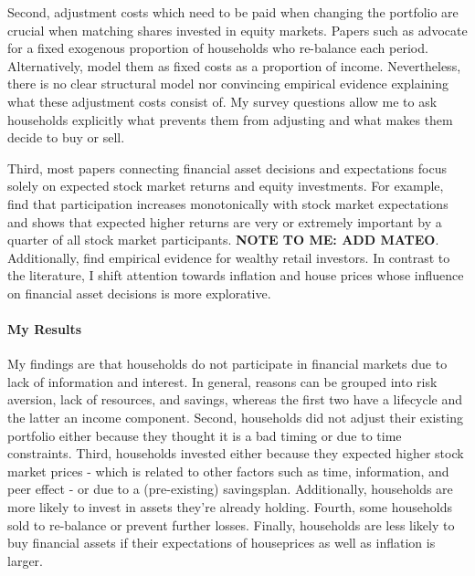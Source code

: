 \documentclass[ProjectABM]{subfiles}
\begin{document}
Second, adjustment costs which need to be paid when changing the portfolio are crucial when matching shares invested in equity markets. Papers such as \cite{giglio_et_al_2019five} advocate for a fixed exogenous proportion of households who re-balance each period. Alternatively,  \cite{bonaparte_et_al_2012adjustment} model them as fixed costs as a proportion of income. Nevertheless, there is no clear structural model nor convincing empirical evidence explaining what these adjustment costs consist of. My survey questions allow me to ask households explicitly what prevents them from adjusting and what makes them decide to buy or sell.

Third, most papers connecting financial asset decisions and expectations focus solely on expected stock market returns and equity investments. For example, \cite{arrondel_et_al_2014subjective_return_expectation} find that participation increases monotonically with stock market expectations and \cite{choi_2020} shows that expected higher returns are very or extremely important by a quarter of all stock market participants. \textbf{NOTE TO ME: ADD MATEO}. Additionally, \cite{giglio_et_al_2019five} find empirical evidence for wealthy retail investors. In contrast to the literature, I shift attention towards inflation and house prices whose influence on financial asset decisions is more explorative. %


\paragraph{My Results}
My findings are that households do not participate in financial markets due to lack of information and interest. In general, reasons can be grouped into risk aversion, lack of resources, and savings, whereas the first two have a lifecycle and the latter an income component. Second, households did not adjust their existing portfolio either because they thought it is a bad timing or due to time constraints. Third, households invested either because they expected higher stock market prices - which is related to other factors such as time, information, and peer effect - or due to a (pre-existing) savingsplan. Additionally, households are more likely to invest in assets they're already holding. Fourth, some households sold to re-balance or prevent further losses. Finally, households are less likely to buy financial assets if their expectations of houseprices as well as inflation is larger.
\end{document}
